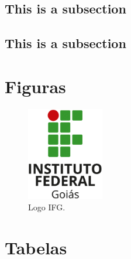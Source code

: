 \documentclass[palette=nighthill]{formatacao/classe-apostila}
\begin{document}
\subsection{This is a subsection}
\lipsum[1-1]

\begin{fato}
    \lipsum[10-21]
\end{fato}

\subsection{This is a subsection}
\lipsum[1-2]

\begin{aplicacao}
    \lipsum[1-5]
\end{aplicacao}

\lipsum[1-2]

\section{Figuras}

\lipsum[1-1]

\begin{figure}[ht!]
  \centering
  \includegraphics[width=0.3\textwidth]{fig/logo-ifg-vertical}
  \caption{Logo IFG.}
  \label{fig:exemploFig1}
 \end{figure}

 \section{Tabelas}

 \lipsum[1-1]
\end{document}
